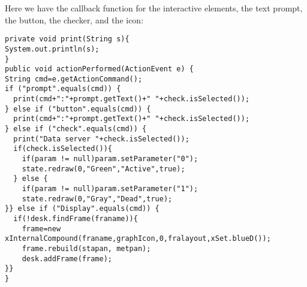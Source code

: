 Here we have the callback function for the interactive elements,
the text prompt, the button, the checker, and the icon:
{\small \begin{verbatim}
private void print(String s){
System.out.println(s);
}
public void actionPerformed(ActionEvent e) {
String cmd=e.getActionCommand();
if ("prompt".equals(cmd)) {
  print(cmd+":"+prompt.getText()+" "+check.isSelected());
} else if ("button".equals(cmd)) {
  print(cmd+":"+prompt.getText()+" "+check.isSelected());
} else if ("check".equals(cmd)) {
  print("Data server "+check.isSelected());
  if(check.isSelected()){
    if(param != null)param.setParameter("0");
    state.redraw(0,"Green","Active",true);
  } else {
    if(param != null)param.setParameter("1");
    state.redraw(0,"Gray","Dead",true);
}} else if ("Display".equals(cmd)) {
  if(!desk.findFrame(franame)){
    frame=new xInternalCompound(franame,graphIcon,0,fralayout,xSet.blueD());
    frame.rebuild(stapan, metpan); 
    desk.addFrame(frame); 
}}
}
\end{verbatim}
}
